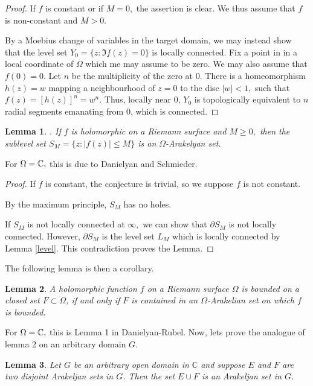 \documentclass[12pt]{article}
\newtheorem{lem}{Lemma}
\newcommand{\C}{\Bbb C}
\begin{document}
\begin{proof}If $f$ is constant or if $M=0,$ the assertion is clear. We thus assume that $f$ is non-constant and $M>0.$ 

By a Moebius change of variables in the target domain, we may instead show that the level set $Y_0 = \{z: \Im f(z)=0\}$ is locally connected.  
 Fix a point in  in a local coordinate of $\Omega$ which me may assume to be zero. We may also assume that $f(0)=0.$ Let $n$ be the multiplicity of the zero at $0.$ 
There is a homeomorphism $h(z)=w$ mapping a neighbourhood of $z=0$ to the disc $|w|<1,$  such that $f(z)=[h(z)]^n=w^n.$ Thus, locally near $0$, $Y_0$ is topologically equivalent to $n$ radial segments emanating from $0$, which is connected.   
\end{proof}

\begin{lem}\label{level Arakelyan}.  If $f$ is holomorphic on a Riemann surface and $M\ge 0,$ then the sublevel set $S_M=\{z:|f(z)|\le M\}$ is an $\Omega$-Arakelyan set.  
\end{lem}

 For $\Omega=\C,$ this is due to Danielyan and Schmieder.  
\begin{proof}
If $f$ is constant,  the conjecture is trivial, so we suppose $f$ is not constant. 

By the maximum principle,  $S_M$ has no holes.   
 

If $S_M$ is not locally connected at $\infty,$ we can show that $\partial S_M$  is not locally connected.  However, $\partial S_M$ is the level set $L_M$ which is locally connected by Lemma \ref{level}.  This contradiction proves the Lemma. 
\end{proof}


The following lemma is then a corollary. 

\begin{lem}
A holomorphic function $f$ on a Riemann surface $\Omega$ is bounded on a closed set $F\subset\Omega$, if and only if $F$ is contained in an $\Omega$-Arakelian set on which $f$ is bounded.   
\end{lem}



For $\Omega=\C,$ this is  Lemma 1 in Danielyan-Rubel. 
 \noindent Now, lets prove the analogue of {lemma 2} on an arbitrary domain $G$.

\begin{lem}
Let $G$ be an arbitrary open domain in $\mathbb{C}$ and suppose $E$ and $F$ are two disjoint Arakeljan sets in $G$. Then the set $E\cup F$ is an Arakeljan set in $G$.
\end{lem}
\end{document}
